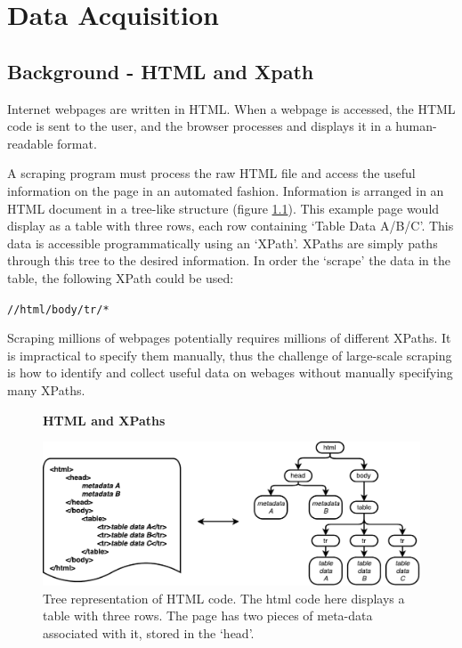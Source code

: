 \chapter{Data Acquisition}
\addtocounter{page}{1}

\label{chapt:DATA_ACQUISITION}
\section{Background - HTML and Xpath}

Internet webpages are written in HTML. When a webpage is accessed, the HTML code is sent to the user, and the browser processes and displays it in a human-readable format. 

A scraping program must process the raw HTML file and access the useful information on the page in an automated fashion. Information is arranged in an HTML document in a tree-like structure (figure \ref{fig:HTMLTREE}). This example page would display as a table with three rows, each row containing `Table Data A/B/C'. This data is accessible programmatically using an `XPath'. 
XPaths are simply paths through this tree to the desired information. In order the `scrape' the data in the table, the following XPath could be used:
\begin{center}
\texttt{//html/body/tr/*}
\end{center}
Scraping millions of webpages potentially requires millions of different XPaths. It is impractical to specify them manually, thus the challenge of large-scale scraping is how to identify and collect useful data on webages without manually specifying many XPaths.
\newpage
\addtocounter{page}{-2}
\begin{figure}[H]
    \centering
    \textbf{HTML and XPaths}\par\medskip
    \includegraphics[width=\textwidth]{Data_Acquisition/html_tree.pdf}
    \caption[Tree representation of HTML Code]{Tree representation of HTML code. The html code here displays a table with three rows. The page has two pieces of meta-data associated with it, stored in the `head'.}
\label{fig:HTMLTREE}
\end{figure}
\newpage

